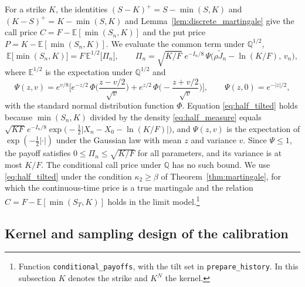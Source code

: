 \documentclass[11pt,a4paper]{article}
\theoremstyle{definition}
\newcommand{\E}{\mathbb{E}}
\newcommand{\Q}{\mathbb{Q}}
\begin{document}
For a strike $K$, the identities $(S-K)^+=S-\min(S,K)$ and $(K-S)^+=K-\min(S,K)$ and Lemma~\ref{lem:discrete_martingale} give the call price $C=F-\E[\min(S_n,K)]$ and the put price $P=K-\E[\min(S_n,K)]$. We evaluate the common term under $\Q^{1/2}$,
\begin{equation}\label{eq:half_tilted}
\E\big[\min(S_n,K)\big]=F\,\E^{1/2}\big[\Pi_n\big],\qquad \Pi_n=\sqrt{K/F}\;e^{-I_n/8}\,\Psi\big(\rho\tilde J_n-\ln(K/F),\,v_n\big),
\end{equation}
where $\E^{1/2}$ is the expectation under $\Q^{1/2}$ and
\begin{equation*}
\Psi(z,v)=e^{v/8}\bigg[e^{-z/2}\,\Phi\Big(\frac{z-v/2}{\sqrt v}\Big)+e^{z/2}\,\Phi\Big(-\frac{z+v/2}{\sqrt v}\Big)\bigg],\qquad \Psi(z,0)=e^{-|z|/2},
\end{equation*}
with the standard normal distribution function $\Phi$. Equation \eqref{eq:half_tilted} holds because $\min(S_n,K)$ divided by the density \eqref{eq:half_measure} equals $\sqrt{KF}\,e^{-I_n/8}\exp\big(-\tfrac12|X_n-X_0-\ln(K/F)|\big)$, and $\Psi(z,v)$ is the expectation of $\exp(-\tfrac12|\cdot|)$ under the Gaussian law with mean $z$ and variance $v$. Since $\Psi\le1$, the payoff satisfies $0\le\Pi_n\le\sqrt{K/F}$ for all parameters, and its variance is at most $K/F$. The conditional call price under $\Q$ has no such bound. We use \eqref{eq:half_tilted} under the condition $\kappa_2\ge\beta$ of Theorem~\ref{thm:martingale}, for which the continuous-time price is a true martingale and the relation $C=F-\E[\min(S_T,K)]$ holds in the limit model.\footnote{Function \texttt{conditional\_payoffs}, with the tilt set in \texttt{prepare\_history}. In this subsection $K$ denotes the strike and $K^N$ the kernel.}

\subsection{Kernel and sampling design of the calibration}\label{sec:calibration_design}
\end{document}
